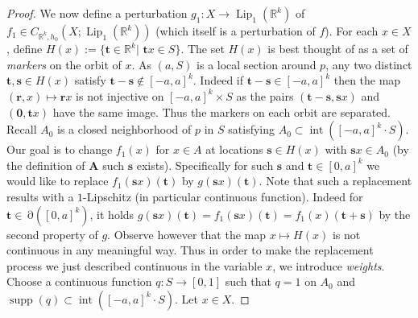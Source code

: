 \documentclass[11pt]{article}
\theoremstyle{plain}
\theoremstyle{definition}
\DeclareMathOperator{\Lip}{Lip}
\DeclareMathOperator{\Int}{int}
\DeclareMathOperator{\Edge}{\partial}
\DeclareMathOperator{\supp}{supp}
\def\Rk{\mathbb{R}^k}
\def\tt{\mathbf t}
\def\ss{\mathbf s}
\def\rr{\mathbf r}
\def\AA{\mathbf A}
\def\00{\mathbf 0}
\numberwithin{figure}{section}
\begin{document}
\begin{proof}
\noindent     We now define a perturbation $g_1:X\to\Lip_{1}(\Rk)$ of $f_1\in C_{\Rk,h_0}(X;\Lip_{1}(\Rk))$ (which itself is a perturbation of $f$). For each $x\in X$, define $H(x):=\{\mathbf t\in\Rk|\,\, \tt x\in S\}$. The set $H(x)$ is best thought of as a set of \textit{markers} on the orbit of $x$. As $(a,S)$ is a local section around $p$, any two distinct $\mathbf {t,s}\in H(x)$ satisfy $\tt-\ss\notin [-a,a]^k$. Indeed if  $\tt-\ss\in [-a,a]^k$ then the map $(\rr,x)\mapsto \rr  x$ is not injective on $[-a,a]^k\times S$ as the pairs $(\tt-\ss, \ss x)$ and  $(\00, \tt x)$ have the same image. Thus the markers on each orbit are separated.
Recall  $A_0$ is a closed neighborhood of $p$ in $S$ satisfying $A_0\subset\Int([-a,a]^k\cdot S)$. Our goal is to change $f_1(x)$ for $x\in A$ at locations  $\ss\in H(x)$ with $\ss x \in A_0$ (by the definition of $\AA$ such $\ss$ exists). Specifically for such $\ss$ and $\tt\in [0,a]^k$ we would like to replace $f_1(\ss x)(\tt)$ by $g(\ss x)(\tt)$. Note that such a replacement results with a $1$-Lipschitz (in particular continuous function). Indeed  for $\mathbf t\in \Edge([0,a]^k)$, it holds $g(\ss x)(\tt)=f_1(\ss x)(\tt)=f_1(x)(\tt+\ss)$ by the second property of $g$. Observe however that the map $x\mapsto H(x)$ is not continuous in any meaningful way. Thus in order to make the replacement process we just described continuous in the variable $x$, we introduce \textit{weights}. 
Choose a continuous function $q:S\to[0,1]$ such that $q=1$ on $A_0$ and $\supp(q)\subset\Int([-a,a]^k\cdot S)$.
Let $x\in X$.


\end{proof}
\end{document}
